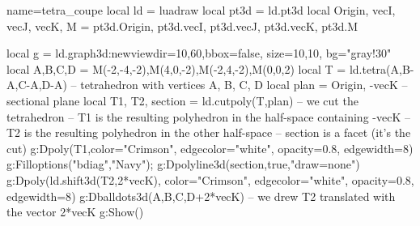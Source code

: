 \begin{luadraw}{name=tetra_coupe}
local ld = luadraw
local pt3d = ld.pt3d
local Origin, vecI, vecJ, vecK, M = pt3d.Origin, pt3d.vecI, pt3d.vecJ, pt3d.vecK, pt3d.M

local g = ld.graph3d:new{viewdir={10,60},bbox=false, size={10,10}, bg="gray!30"}
local A,B,C,D = M(-2,-4,-2),M(4,0,-2),M(-2,4,-2),M(0,0,2)
local T = ld.tetra(A,B-A,C-A,D-A) -- tetrahedron with vertices A, B, C, D
local plan = {Origin, -vecK} -- sectional plane
local T1, T2, section = ld.cutpoly(T,plan) -- we cut the tetrahedron
-- T1 is the resulting polyhedron in the half-space containing -vecK
-- T2 is the resulting polyhedron in the other half-space
-- section is a facet (it's the cut)
g:Dpoly(T1,{color="Crimson", edgecolor="white", opacity=0.8, edgewidth=8})
g:Filloptions("bdiag","Navy"); g:Dpolyline3d(section,true,"draw=none")
g:Dpoly(ld.shift3d(T2,2*vecK), {color="Crimson", edgecolor="white", opacity=0.8, edgewidth=8})
g:Dballdots3d({A,B,C,D+2*vecK}) -- we drew T2 translated with the vector 2*vecK
g:Show()
\end{luadraw}

